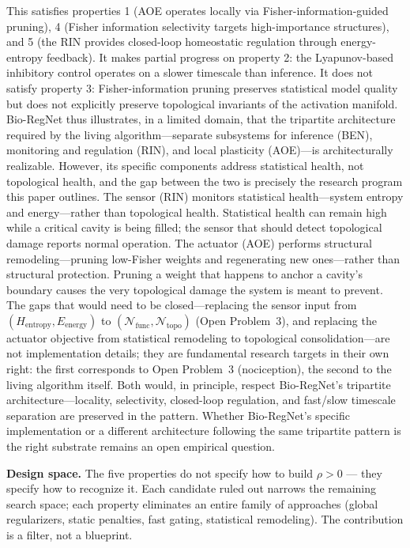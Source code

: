 \documentclass{article}
\begin{document}
This satisfies properties 1 (AOE operates locally via Fisher-information-guided pruning), 4 (Fisher information selectivity targets high-importance structures), and 5 (the RIN provides closed-loop homeostatic regulation through energy-entropy feedback). It makes partial progress on property 2: the Lyapunov-based inhibitory control operates on a slower timescale than inference. It does not satisfy property 3: Fisher-information pruning preserves statistical model quality but does not explicitly preserve topological invariants of the activation manifold. Bio-RegNet thus illustrates, in a limited domain, that the tripartite architecture required by the living algorithm---separate subsystems for inference (BEN), monitoring and regulation (RIN), and local plasticity (AOE)---is architecturally realizable. However, its specific components address statistical health, not topological health, and the gap between the two is precisely the research program this paper outlines. The sensor (RIN) monitors statistical health---system entropy and energy---rather than topological health. Statistical health can remain high while a critical cavity is being filled; the sensor that should detect topological damage reports normal operation. The actuator (AOE) performs structural remodeling---pruning low-Fisher weights and regenerating new ones---rather than structural protection. Pruning a weight that happens to anchor a cavity's boundary causes the very topological damage the system is meant to prevent. The gaps that would need to be closed---replacing the sensor input from $(H_{\text{entropy}}, E_{\text{energy}})$ to $(\mathcal{N}_{\text{func}}, \mathcal{N}_{\text{topo}})$ (Open Problem~3), and replacing the actuator objective from statistical remodeling to topological consolidation---are not implementation details; they are fundamental research targets in their own right: the first corresponds to Open Problem~3 (nociception), the second to the living algorithm itself. Both would, in principle, respect Bio-RegNet's tripartite architecture---locality, selectivity, closed-loop regulation, and fast/slow timescale separation are preserved in the pattern. Whether Bio-RegNet's specific implementation or a different architecture following the same tripartite pattern is the right substrate remains an open empirical question.

\medskip
\noindent\textbf{Design space.} The five properties do not specify how to build $\rho > 0$ --- they specify how to recognize it. Each candidate ruled out narrows the remaining search space; each property eliminates an entire family of approaches (global regularizers, static penalties, fast gating, statistical remodeling). The contribution is a filter, not a blueprint.
\end{document}

